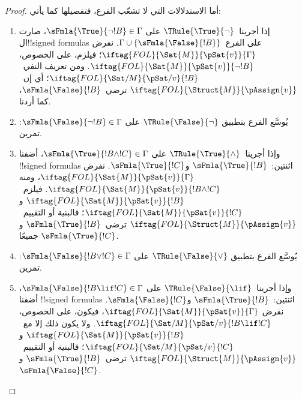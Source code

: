 \documentclass[../../../include/open-logic-section]{subfiles}
\begin{document}
\begin{proof}
أما الاستدلالات التي لا تشعّب الفرع، فتفصيلها كما يأتي:
\begin{enumerate}
\item إذا أجرينا~$\TRule{\True}{\lnot}$ على
  $\sFmla{\True}{\lnot !B} \in \Gamma$، صارت
  ال!!{signed formula}s على الفرع~$\Gamma \cup
  \{\sFmla{\False}{!B}\}$. نفرض
  $\iftag{FOL}{\Sat{M}}{\pSat{v}}{\Gamma}$؛ فيلزم، على الخصوص،
  $\iftag{FOL}{\Sat{M}}{\pSat{v}}{\lnot !B}$.
  ومن تعريف النفي~$\iftag{FOL}{\Sat/{M}}{\pSat/{v}}{!B}$؛
  أي إن~$\iftag{FOL}{\Struct{M}}{\pAssign{v}}$
  ترضي~$\sFmla{\False}{!B}$، كما أردنا.
\item يُوسَّع الفرع بتطبيق $\TRule{\False}{\lnot}$ على
  $\sFmla{\False}{\lnot !B} \in \Gamma$: تمرين.
\item وإذا أجرينا~$\TRule{\True}{\land}$ على
  $\sFmla{\True}{!B \land !C} \in \Gamma$،
  أضفنا !!{signed formula}s اثنتين:~$\sFmla{\True}{!B}$
  و$\sFmla{\True}{!C}$. نفرض
  $\iftag{FOL}{\Sat{M}}{\pSat{v}}{\Gamma}$، ومنه
  $\iftag{FOL}{\Sat{M}}{\pSat{v}}{!B \land !C}$.
  فيلزم~$\iftag{FOL}{\Sat{M}}{\pSat{v}}{!B}$ و
  $\iftag{FOL}{\Sat{M}}{\pSat{v}}{!C}$؛
  فالبنية أو التقييم~$\iftag{FOL}{\Struct{M}}{\pAssign{v}}$
  ترضي~$\sFmla{\True}{!B}$ و$\sFmla{\True}{!C}$ جميعًا.
\item يُوسَّع الفرع بتطبيق $\TRule{\False}{\lor}$ على
  $\sFmla{\False}{!B \lor !C} \in \Gamma$: تمرين.
\item وإذا أجرينا~$\TRule{\False}{\lif}$ على
  $\sFmla{\False}{!B \lif !C} \in \Gamma$،
  أضفنا !!{signed formula}s اثنتين:~$\sFmla{\True}{!B}$
  و$\sFmla{\False}{!C}$. نفرض
  $\iftag{FOL}{\Sat{M}}{\pSat{v}}{\Gamma}$، فيكون، على الخصوص،
  $\iftag{FOL}{\Sat/{M}}{\pSat/{v}}{!B \lif !C}$.
  ولا يكون ذلك إلا مع~$\iftag{FOL}{\Sat{M}}{\pSat{v}}{!B}$
  و$\iftag{FOL}{\Sat/{M}}{\pSat/{v}}{!C}$؛
  فالبنية أو التقييم~$\iftag{FOL}{\Struct{M}}{\pAssign{v}}$
  ترضي~$\sFmla{\True}{!B}$ و$\sFmla{\False}{!C}$.


\end{enumerate}
\end{proof}
\end{document}
